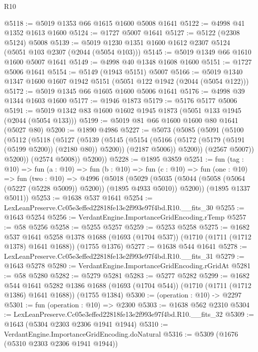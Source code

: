 \begin{lexlean}{R10}
\begin{coremodule}
@5118 := @5019 @1353 @66 @1615 @1600 @5008 @1641
@5122 := @4998 @41 @1352 @1613 @1600
@5124 := @1727 @5007 @1641
@5127 := @5122 (@2308 @5124) @5008
@5139 := @5019 @1230 @1351 @1600 @1612 @2307 @5124 (@5051 @103 @2307 (@2044 (@5054 @103)))
@5145 := @5019 @1349 @66 @1610 @1600 @5007 @1641
@5149 := @4998 @40 @1348 @1608 @1600
@5151 := @1727 @5006 @1641
@5154 := @5149 (@1943 @5151) @5007
@5166 := @5019 @1340 @1347 @1600 @1607 @1942 @5151 (@5051 @122 @1942 (@2044 (@5054 @122)))
@5172 := @5019 @1345 @66 @1605 @1600 @5006 @1641
@5176 := @4998 @39 @1344 @1603 @1600
@5177 := @1946 @1873
@5179 := @5176 @5177 @5006
@5191 := @5019 @1342 @83 @1600 @1602 @1945 @1873 (@5051 @133 @1945 (@2044 (@5054 @133)))
@5199 := @5019 @81 @66 @1600 @1600 @80 @1641 (@5027 @80)
@5200 := @1890 @4986
@5227 := @5073
    (@5085
      (@5091
        (@5100
          (@5112
            (@5118
              (@5127
                (@5139
                  (@5145
                    (@5154
                      (@5166 (@5172 (@5179 (@5191 (@5199 @5200)) (@2180 @80)) @5200))
                      (@2187 @5006))
                    @5200))
                (@2567 @5007))
              @5200))
          (@2574 @5008))
        @5200))
@5228 := @1895 @3859
@5251 := fun (tag : @10) =>
  fun (a : @10) =>
  fun (b : @10) =>
  fun (c : @10) =>
  fun (one : @10) =>
  fun (two : @10) =>
  @4996
    (@5018
      (@5029 (@5035 (@5044 (@5058 (@5064 (@5227 (@5228 @5009)) @5200)) (@1895 @4933 @5010)) @5200))
      (@1895 @1337 @5011))
@5253 := @1638 @537 @1641
@5254 := LexLeanPreserve.Cc05e3effed22818fe13e2f993e97f4bd.R10.__fits_30
@5255 := @1643 @5254
@5256 := VerdantEngine.ImportanceGridEncoding.rTemp
@5257 := @58 @5256
@5258 := @5255 @5257
@5259 := @5253 @5258
@5275 := @1682
    @537
    @1641
    @5258
    @1378
    @1688
    (@1693 (@1704 @537))
    (@1710 (@1711 (@1712 @1378) @1641 @1688))
    (@1755 @1376)
@5277 := @1638 @544 @1641
@5278 := LexLeanPreserve.Cc05e3effed22818fe13e2f993e97f4bd.R10.__fits_31
@5279 := @1643 @5278
@5280 := VerdantEngine.ImportanceGridEncoding.rGridAt
@5281 := @58 @5280
@5282 := @5279 @5281
@5283 := @5277 @5282
@5299 := @1682
    @544
    @1641
    @5282
    @1386
    @1688
    (@1693 (@1704 @544))
    (@1710 (@1711 (@1712 @1386) @1641 @1688))
    (@1755 @1384)
@5300 := (operation : @10) -> @2297
@5301 := fun (operation : @10) => @2300
@5303 := @1638 @562 @2310
@5304 := LexLeanPreserve.Cc05e3effed22818fe13e2f993e97f4bd.R10.__fits_32
@5309 := @1643 (@5304 @2303 @2306 @1941 @1944)
@5310 := VerdantEngine.ImportanceGridEncoding.doNatural
@5316 := @5309 (@1676 (@5310 @2303 @2306 @1941 @1944))

\end{coremodule}
\end{lexlean}
